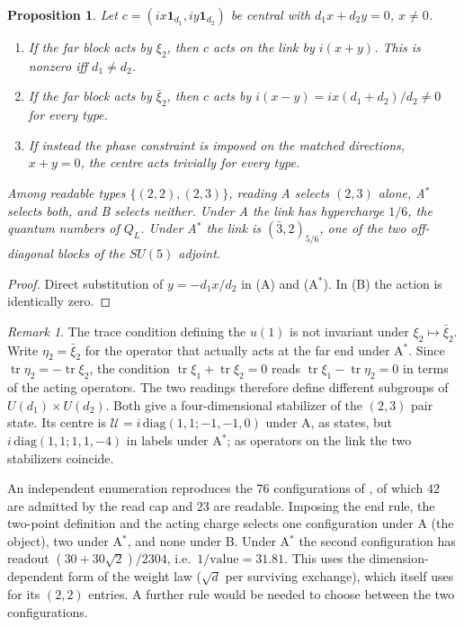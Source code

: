 \documentclass[11pt]{article}
\newtheorem{proposition}{Proposition}
\theoremstyle{remark}
\newtheorem{remark}{Remark}
\begin{document}
\begin{proposition}\label{prop:conv}
Let $c=(ix\mathbf 1_{d_1},iy\mathbf 1_{d_2})$ be central with $d_1x+d_2y=0$, $x\neq0$.
\begin{enumerate}
\item[(A)] If the far block acts by $\xi_2$, then $c$ acts on the link by $i(x+y)$. This is nonzero iff $d_1\neq d_2$.
\item[(A$^*$)] If the far block acts by $\bar\xi_2$, then $c$ acts by $i(x-y)=ix(d_1+d_2)/d_2\neq0$ for every type.
\item[(B)] If instead the phase constraint is imposed on the matched directions, $x+y=0$, the centre acts trivially for every type.
\end{enumerate}
Among readable types $\{(2,2),(2,3)\}$, reading A selects $(2,3)$ alone, A$^*$ selects both, and B selects neither. Under A the link has hypercharge $1/6$, the quantum numbers of $Q_L$. Under A$^*$ the link is $(\bar3,2)_{5/6}$, one of the two off-diagonal blocks of the $SU(5)$ adjoint.
\end{proposition}
\begin{proof}
Direct substitution of $y=-d_1x/d_2$ in (A) and (A$^*$). In (B) the action is identically zero.
\end{proof}

\begin{remark}
The trace condition defining the $u(1)$ is not invariant under $\xi_2\mapsto\bar\xi_2$. Write $\eta_2=\bar\xi_2$ for the operator that actually acts at the far end under A$^*$. Since $\operatorname{tr}\eta_2=-\operatorname{tr}\xi_2$, the condition $\operatorname{tr}\xi_1+\operatorname{tr}\xi_2=0$ reads $\operatorname{tr}\xi_1-\operatorname{tr}\eta_2=0$ in terms of the acting operators. The two readings therefore define different subgroups of $U(d_1)\times U(d_2)$. Both give a four-dimensional stabilizer of the $(2,3)$ pair state. Its centre is $\mathcal U=i\,\mathrm{diag}(1,1;-1,-1,0)$ under A, as \cite[Thm.~S-stabilizer]{wg} states, but $i\,\mathrm{diag}(1,1;1,1,-4)$ in labels under A$^*$; as operators on the link the two stabilizers coincide.
\end{remark}

An independent enumeration reproduces the $76$ configurations of \cite[Sec.~S5]{wg}, of which $42$ are admitted by the read cap and $23$ are readable. Imposing the end rule, the two-point definition and the acting charge selects one configuration under A (the object), two under A$^*$, and none under B. Under A$^*$ the second configuration has readout $(30+30\sqrt2)/2304$, i.e.\ $1/\text{value}=31.81$. This uses the dimension-dependent form of the weight law ($\sqrt d$ per surviving exchange), which \cite[Sec.~S5, Table S5]{wg} itself uses for its $(2,2)$ entries. A further rule would be needed to choose between the two configurations.
\end{document}
